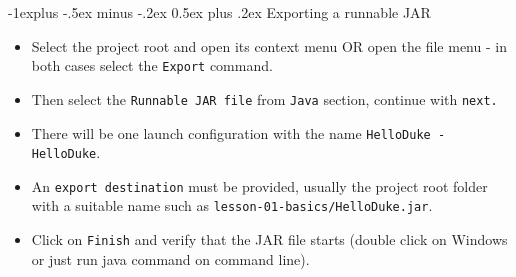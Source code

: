 \documentclass[10pt,landscape]{article}
\makeatletter
\renewcommand{\subsection}{\@startsection{subsection}{2}{0mm}%
                                {-1explus -.5ex minus -.2ex}%
                                {0.5ex plus .2ex}%
                                {\normalfont\normalsize\bfseries}}
\makeatother
\begin{document}
\begin{multicols}{2}
\subsection{Exporting a runnable JAR}
\begin{itemize}
\item Select the project root and open its context menu OR open the file menu - in both cases select the \texttt{Export} command.
\item Then select the \texttt{Runnable JAR file} from \texttt{Java} section, continue with \texttt{next.}
\item There will be one launch configuration with the name \texttt{HelloDuke - HelloDuke}.
\item An \texttt{export destination} must be provided, usually the project root folder with a suitable name such as \texttt{lesson-01-basics/HelloDuke.jar}.
\item Click on \texttt{Finish} and verify that the JAR file starts (double click on Windows or just run java command on command line).
\end{itemize}
\end{multicols}
\end{document}
